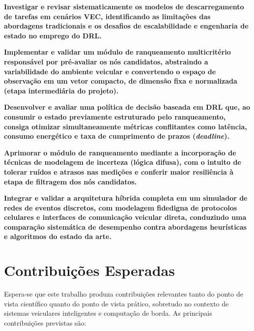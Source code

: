 \begin{alineas}[label=OE\arabic*.]
    \item \textbf{Investigar e revisar sistematicamente os modelos de descarregamento de tarefas em cenários \gls{VEC}, identificando as limitações das abordagens tradicionais e os desafios de escalabilidade e engenharia de estado no emprego do \gls{DRL}.}
    \item \textbf{Implementar e validar um módulo de ranqueamento multicritério responsável por pré-avaliar os nós candidatos, abstraindo a variabilidade do ambiente veicular e convertendo o espaço de observação em um vetor compacto, de dimensão fixa e normalizada (etapa intermediária do projeto).}
    \item \textbf{Desenvolver e avaliar uma política de decisão baseada em \gls{DRL} que, ao consumir o estado previamente estruturado pelo ranqueamento, consiga otimizar simultaneamente métricas conflitantes como latência, consumo energético e taxa de cumprimento de prazos (\textit{deadline}).}
    \item \textbf{Aprimorar o módulo de ranqueamento mediante a incorporação de técnicas de modelagem de incerteza (lógica difusa), com o intuito de tolerar ruídos e atrasos nas medições e conferir maior resiliência à etapa de filtragem dos nós candidatos.}
    \item \textbf{Integrar e validar a arquitetura híbrida completa em um simulador de redes de eventos discretos, com modelagem fidedigna de protocolos celulares e interfaces de comunicação veicular direta, conduzindo uma comparação sistemática de desempenho contra abordagens heurísticas e algoritmos do estado da arte.}
\end{alineas}

\section{Contribuições Esperadas}
\label{sec:contribuicoes}
Espera-se que este trabalho produza contribuições relevantes tanto do ponto de vista científico quanto do ponto de vista prático, sobretudo no contexto de sistemas veiculares inteligentes e computação de borda. As principais contribuições previstas são:


